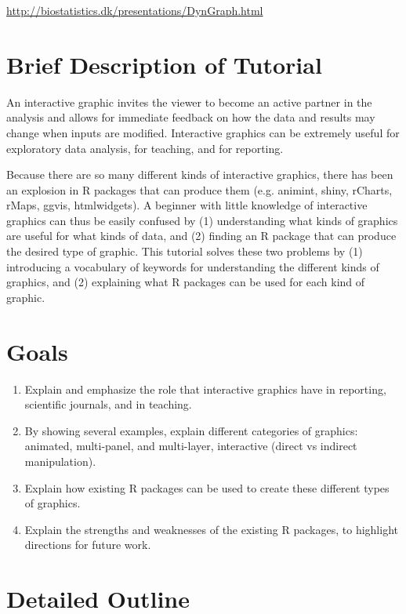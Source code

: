 \documentclass[11pt]{article}
\begin{document}
\url{http://biostatistics.dk/presentations/DynGraph.html}

\section{Brief Description of Tutorial}
\label{sec:orgheadline5}

An interactive graphic invites the viewer to become an active partner
in the analysis and allows for immediate feedback on how the data and
results may change when inputs are modified. Interactive graphics can
be extremely useful for exploratory data analysis, for teaching, and
for reporting.

Because there are so many different kinds of interactive graphics,
there has been an explosion in R packages that can produce them
(e.g. animint, shiny, rCharts, rMaps, ggvis, htmlwidgets). A beginner
with little knowledge of interactive graphics can thus be easily
confused by (1) understanding what kinds of graphics are useful for
what kinds of data, and (2) finding an R package that can produce the
desired type of graphic. This tutorial solves these two problems by
(1) introducing a vocabulary of keywords for understanding the
different kinds of graphics, and (2) explaining what R packages can be
used for each kind of graphic.

\section{Goals}
\label{sec:orgheadline6}

\begin{enumerate}
\item Explain and emphasize the role that interactive graphics have in
reporting, scientific journals, and in teaching.
\item By showing several examples, explain different categories of
graphics: animated, multi-panel, and multi-layer, interactive
(direct vs indirect manipulation).
\item Explain how existing R packages can be used to create these
different types of graphics.
\item Explain the strengths and weaknesses of the existing R packages, to
highlight directions for future work.
\end{enumerate}

\section{Detailed Outline}
\label{sec:orgheadline10}
\end{document}
